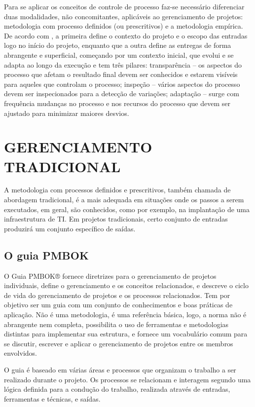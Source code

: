 Para se aplicar os conceitos de controle de processo faz-se necessário diferenciar duas modalidades, não concomitantes, aplicáveis ao gerenciamento de projetos: metodologia com processo definidos (ou prescritivos) e a metodologia empírica. De acordo com \cite{martins2007}, a primeira define o contexto do projeto e o escopo das entradas logo no início do projeto, enquanto que a outra define as entregas de forma abrangente e superficial, começando por um contexto inicial, que evolui e se adapta ao longo da execução e tem três pilares: transparência – os aspectos do processo que afetam o resultado final devem ser conhecidos e estarem visíveis para aqueles que controlam o processo; inspeção – vários aspectos do processo devem ser inspecionados para a detecção de variações; adaptação – surge com frequência mudanças no processo e nos recursos do processo que devem ser ajustado para minimizar maiores desvios. \cite{kenvolaro}

\section{GERENCIAMENTO TRADICIONAL}
A metodologia com processos definidos e prescritivos, também chamada de abordagem tradicional, é a mais adequada em situações onde os passos a serem executados, em geral, são conhecidos, como por exemplo, na implantação de uma infraestrutura de TI. Em projetos tradicionais, certo conjunto de entradas produzirá um conjunto específico de saídas. \cite{martins2007}

\subsection{O guia PMBOK}
O Guia PMBOK® fornece diretrizes para o gerenciamento de projetos individuais, define o gerenciamento e os conceitos relacionados, e descreve o ciclo de vida do gerenciamento de projetos e os processos relacionados. Tem por objetivo ser um guia com um conjunto de conhecimentos e boas práticas de aplicação. Não é uma metodologia, é uma referência básica, logo, a norma não é abrangente nem completa, possibilita o uso de ferramentas e metodologias distintas para implementar sua estrutura, e fornece um vocabulário comum para se discutir, escrever e aplicar o gerenciamento de projetos entre os membros envolvidos.

O guia é baseado em várias áreas e processos que organizam o trabalho a ser realizado durante o projeto. Os processos se relacionam e interagem segundo uma lógica definida para a condução do trabalho, realizada através de entradas, ferramentas e técnicas, e saídas.


